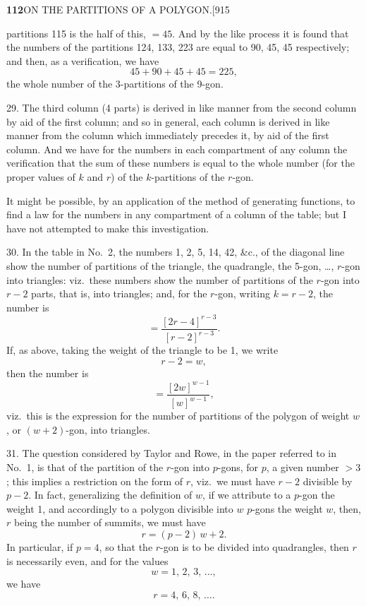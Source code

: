 \documentclass[11pt]{article}
\begin{document}
\newpage
\noindent\textbf{112}\hfill ON THE PARTITIONS OF A POLYGON.\hfill[915

\smallskip
partitions 115 is the half of this, $=45$. And by the like process it is
found that the numbers of the partitions 124, 133, 223 are equal to 90, 45,
45 respectively; and then, as a verification, we have
\[
45+90+45+45=225,
\]
the whole number of the 3-partitions of the 9-gon.

\hspace{1em} 29. The third column (4 parts) is derived in like manner from
the second column by aid of the first column; and so in general, each column
is derived in like manner from the column which immediately precedes it, by
aid of the first column. And we have for the numbers in each compartment of
any column the verification that the sum of these numbers is equal to the
whole number (for the proper values of $k$ and $r$) of the $k$-partitions of
the $r$-gon.

\hspace{1em} It might be possible, by an application of the method of
generating functions, to find a law for the numbers in any compartment of a
column of the table; but I have not attempted to make this investigation.

\hspace{1em} 30. In the table in No.~2, the numbers 1, 2, 5, 14, 42, \&c., of
the diagonal line show the number of partitions of the triangle, the
quadrangle, the 5-gon, \ldots, $r$-gon into triangles: viz.\ these numbers
show the number of partitions of the $r$-gon into $r-2$ parts, that is, into
triangles; and, for the $r$-gon, writing $k=r-2$, the number is
\[
=\frac{[2r-4]^{r-3}}{[r-2]^{r-3}}.
\]
If, as above, taking the weight of the triangle to be 1, we write
\[
r-2=w,
\]
then the number is
\[
=\frac{[2w]^{w-1}}{[w]^{w-1}},
\]
viz.\ this is the expression for the number of partitions of the polygon of
weight $w$, or $(w+2)$-gon, into triangles.

\hspace{1em} 31. The question considered by Taylor and Rowe, in the paper
referred to in No.~1, is that of the partition of the $r$-gon into $p$-gons,
for $p$, a given number $>3$; this implies a restriction on the form of $r$,
viz.\ we must have $r-2$ divisible by $p-2$. In fact, generalizing the
definition of $w$, if we attribute to a $p$-gon the weight 1, and accordingly
to a polygon divisible into $w$ $p$-gons the weight $w$, then, $r$ being the
number of summits, we must have
\[
r=(p-2)\,w+2.
\]
In particular, if $p=4$, so that the $r$-gon is to be divided into
quadrangles, then $r$ is necessarily even, and for the values
\[
w=1,\,2,\,3,\,\ldots,
\]
we have
\[
r=4,\,6,\,8,\,\ldots.
\]
\end{document}

